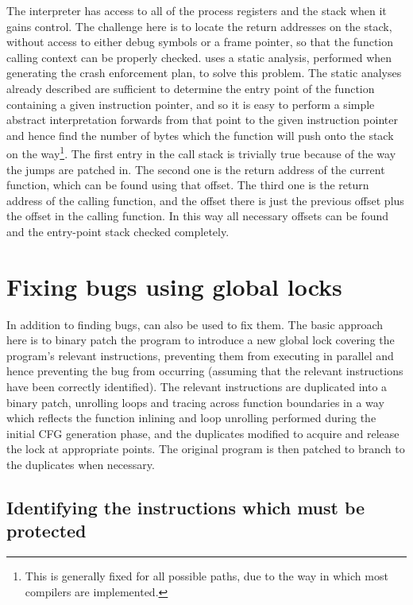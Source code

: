 The interpreter has access to all of the process registers and the
stack when it gains control.  The challenge here is to locate the
return addresses on the stack, without access to either debug symbols
or a frame pointer, so that the function calling context can be
properly checked.  {\Technique} uses a static analysis, performed when
generating the crash enforcement plan, to solve this problem.  The
static analyses already described are sufficient to determine the
entry point of the function containing a given instruction pointer,
and so it is easy to perform a simple abstract interpretation forwards
from that point to the given instruction pointer and hence find the
number of bytes which the function will push onto the stack on the
way\footnote{This is generally fixed for all possible paths, due to
  the way in which most compilers are implemented.}.  The first entry
in the call stack is trivially true because of the way the jumps are
patched in.  The second one is the return address of the current
function, which can be found using that offset.  The third one is the
return address of the calling function, and the offset there is just
the previous offset plus the offset in the calling function.  In this
way all necessary offsets can be found and the entry-point stack
checked completely.  

\section{Fixing bugs using global locks}
\label{sect:fix_global_lock}

In addition to finding bugs, {\technique} can also be used to fix
them.  The basic approach here is to binary patch the program to
introduce a new global lock covering the program's relevant
instructions, preventing them from executing in parallel and hence
preventing the bug from occurring (assuming that the relevant
instructions have been correctly identified).  The relevant
instructions are duplicated into a binary patch, unrolling loops and
tracing across function boundaries in a way which reflects the
function inlining and loop unrolling performed during the initial CFG
generation phase, and the duplicates modified to acquire and release
the lock at appropriate points.  The original program is then patched
to branch to the duplicates when necessary.

\subsection{Identifying the instructions which must be protected}

